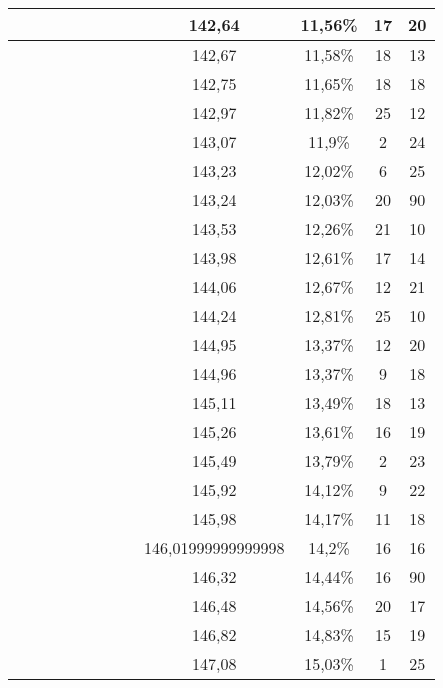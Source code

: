 \begin{center}
\begin{longtable}{|c|c|c|c|c|c|c|c|c|c|c|c|}
 \x &  \x &  &  \x &  &  \x &  &  \x & 142,64 & 11,56\% & 17 & 20  \\ \hline
 \x &  &  \x &  &  &  \x &  &  \x & 142,67 & 11,58\% & 18 & 13  \\ \hline
 \x &  \x &  \x &  &  \x &  &  &  & 142,75 & 11,65\% & 18 & 18  \\ \hline
 \x &  &  \x &  \x &  \x &  \x &  &  \x & 142,97 & 11,82\% & 25 & 12  \\ \hline
 \x &  \x &  &  &  \x &  &  &  \x & 143,07 & 11,9\% & 2 & 24  \\ \hline
 \x &  \x &  \x &  &  &  &  \x &  \x & 143,23 & 12,02\% & 6 & 25  \\ \hline
 \x &  &  \x &  \x &  &  \x &  &  \x & 143,24 & 12,03\% & 20 & 90  \\ \hline
 \x &  \x &  &  \x &  &  &  &  \x & 143,53 & 12,26\% & 21 & 10  \\ \hline
 \x &  \x &  &  &  \x &  &  &  & 143,98 & 12,61\% & 17 & 14  \\ \hline
 \x &  \x &  \x &  &  \x &  &  &  \x & 144,06 & 12,67\% & 12 & 21  \\ \hline
 \x &  \x &  \x &  &  &  \x &  \x &  & 144,24 & 12,81\% & 25 & 10  \\ \hline
 \x &  &  &  \x &  \x &  \x &  &  & 144,95 & 13,37\% & 12 & 20  \\ \hline
 \x &  \x &  \x &  &  \x &  \x &  &  & 144,96 & 13,37\% & 9 & 18  \\ \hline
 \x &  &  &  &  &  \x &  &  \x & 145,11 & 13,49\% & 18 & 13  \\ \hline
 \x &  \x &  &  \x &  \x &  \x &  &  & 145,26 & 13,61\% & 16 & 19  \\ \hline
 \x &  \x &  \x &  \x &  &  &  &  \x & 145,49 & 13,79\% & 2 & 23  \\ \hline
 \x &  &  \x &  &  \x &  \x &  \x &  & 145,92 & 14,12\% & 9 & 22  \\ \hline
 \x &  &  \x &  &  \x &  &  \x &  \x & 145,98 & 14,17\% & 11 & 18  \\ \hline
 \x &  &  \x &  &  &  &  \x &  \x & 146,01999999999998 & 14,2\% & 16 & 16  \\ \hline
 \x &  \x &  \x &  \x &  &  &  \x &  \x & 146,32 & 14,44\% & 16 & 90  \\ \hline
 \x &  &  \x &  \x &  &  &  &  \x & 146,48 & 14,56\% & 20 & 17  \\ \hline
 \x &  &  \x &  &  \x &  &  &  & 146,82 & 14,83\% & 15 & 19  \\ \hline
 \x &  \x &  &  &  &  &  \x &  \x & 147,08 & 15,03\% & 1 & 25  \\ \hline

\end{longtable}
\end{center}
